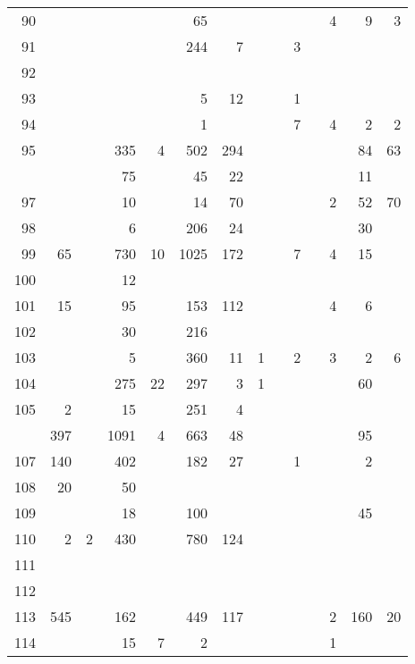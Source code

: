 \documentclass[
]{article}
\begin{document}
\begin{longtable}[l]{rrrrrrrrrrrrrr}
90 &  &  &  &  & 65 &  &  &  &  &  & 4 & 9 & 3\\
\addlinespace
\rowcolor{lightgray}  91 &  &  &  &  & 244 & 7 &  &  & 3 &  &  &  & \\
92 &  &  &  &  &  &  &  &  &  &  &  &  & \\
\rowcolor{lightgray}  93 &  &  &  &  & 5 & 12 &  &  & 1 &  &  &  & \\
94 &  &  &  &  & 1 &  &  &  & 7 &  & 4 & 2 & 2\\
\rowcolor{lightgray}  95 &  &  & 335 & 4 & 502 & 294 &  &  &  &  &  & 84 & 63\\
\addlinespace
96 &  &  & 75 &  & 45 & 22 &  &  &  &  &  & 11 & \\
\rowcolor{lightgray}  97 &  &  & 10 &  & 14 & 70 &  &  &  &  & 2 & 52 & 70\\
98 &  &  & 6 &  & 206 & 24 &  &  &  &  &  & 30 & \\
\rowcolor{lightgray}  99 & 65 &  & 730 & 10 & 1025 & 172 &  &  & 7 &  & 4 & 15 & \\
100 &  &  & 12 &  &  &  &  &  &  &  &  &  & \\
\addlinespace
\rowcolor{lightgray}  101 & 15 &  & 95 &  & 153 & 112 &  &  &  &  & 4 & 6 & \\
102 &  &  & 30 &  & 216 &  &  &  &  &  &  &  & \\
\rowcolor{lightgray}  103 &  &  & 5 &  & 360 & 11 & 1 &  & 2 &  & 3 & 2 & 6\\
104 &  &  & 275 & 22 & 297 & 3 & 1 &  &  &  &  & 60 & \\
\rowcolor{lightgray}  105 & 2 &  & 15 &  & 251 & 4 &  &  &  &  &  &  & \\
\addlinespace
106 & 397 &  & 1091 & 4 & 663 & 48 &  &  &  &  &  & 95 & \\
\rowcolor{lightgray}  107 & 140 &  & 402 &  & 182 & 27 &  &  & 1 &  &  & 2 & \\
108 & 20 &  & 50 &  &  &  &  &  &  &  &  &  & \\
\rowcolor{lightgray}  109 &  &  & 18 &  & 100 &  &  &  &  &  &  & 45 & \\
110 & 2 & 2 & 430 &  & 780 & 124 &  &  &  &  &  &  & \\
\addlinespace
\rowcolor{lightgray}  111 &  &  &  &  &  &  &  &  &  &  &  &  & \\
112 &  &  &  &  &  &  &  &  &  &  &  &  & \\
\rowcolor{lightgray}  113 & 545 &  & 162 &  & 449 & 117 &  &  &  &  & 2 & 160 & 20\\
114 &  &  & 15 & 7 & 2 &  &  &  &  &  & 1 &  & \\

\end{longtable}
\end{document}

